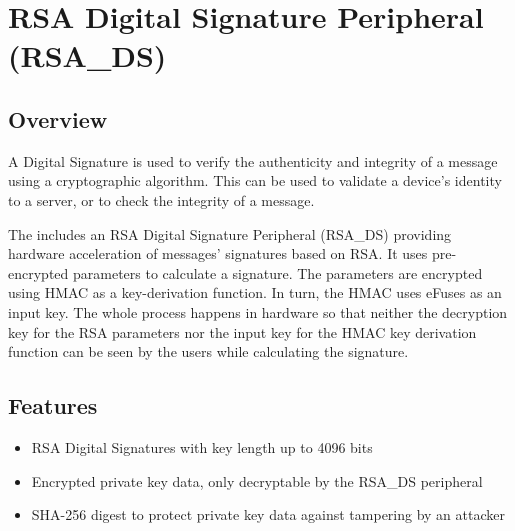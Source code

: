 \documentclass[main\_\_EN.tex]{subfiles}
\begin{document}

\ifglobal
\else
    {\let\clearpage\relax \listoftodos}
    \tableofcontents
\fi



\hypertarget{digsig}{}\hypertarget{rsads}{}
\chapter{RSA Digital Signature Peripheral (RSA\_DS)}
\label{mod:digsig}

\section{Overview}

A Digital Signature is used to verify the authenticity and integrity of a message using a cryptographic algorithm. This can be used to validate a device's identity to a server, or to check the integrity of a message.

The \chipname{} includes an RSA Digital Signature Peripheral (RSA\_DS) providing hardware acceleration of messages' signatures based on RSA. It uses pre-encrypted parameters to calculate a signature. The parameters are encrypted using HMAC as a key-derivation function. In turn, the HMAC uses eFuses as an input key. The whole process happens in hardware so that neither the decryption key for the RSA parameters nor the input key for the HMAC key derivation function can be seen by the users while calculating the signature.

\section{Features}

\begin{itemize}
\item RSA Digital Signatures with key length up to 4096 bits
\item Encrypted private key data, only decryptable by the RSA\_DS peripheral
\item SHA-256 digest to protect private key data against tampering by an attacker
\end{itemize}
\end{document}
